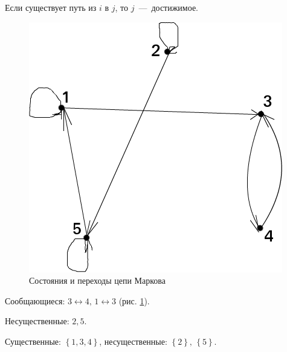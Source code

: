 Если существует путь из $i$ в $j$, то $j$~---~достижимое.

\begin{figure}[h!]
  \centering
  \includegraphics[width=.4\textwidth]{./pictures/14_6.png}
  \caption{Состояния и переходы цепи Маркова}
  \label{fig:146}
\end{figure}

Сообщающиеся: $3 \leftrightarrow 4, \, 1 \leftrightarrow 3$ (рис. \ref{fig:146}).

Несущественные: $2, 5$.

Существенные: $ \left\{ 1, 3, 4 \right\} $, несущественные:
$ \left\{ 2 \right\}, \, \left\{ 5 \right\} $.

